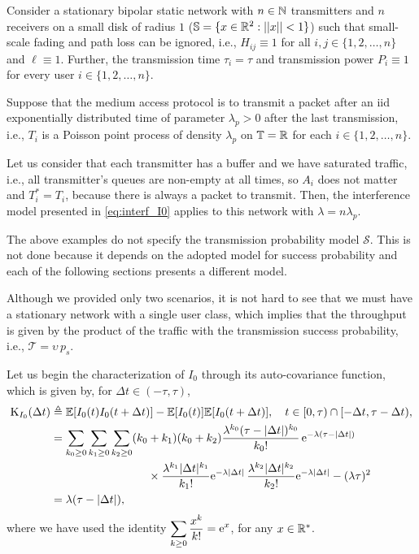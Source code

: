 \begin{example}
    Consider a stationary bipolar static network with $n\in{\mathbb N}$ transmitters and $n$ receivers on a small disk of radius $1$ (${\mathbb S}=\{x\in{\mathbb R}^2: ||x|| < 1\}$) such that small-scale fading and path loss can be ignored, i.e., $H_{ij} \equiv 1$ for all $i,j\in\{1,2,\dots,n\}$ and $\ell \equiv 1$.
    Further, the transmission time $\tau_i = \tau$ and transmission power $P_i \equiv 1$ for every user $i\in\{1,2,\dots,n\}$.
    
    Suppose that the medium access protocol is to transmit a packet after an iid exponentially distributed time of parameter $\lambda_p > 0$ after the last transmission, i.e., $T_i$ is a Poisson point process of density $\lambda_p$ on ${\mathbb T} = {\mathbb R}$ for each $i\in\{1,2,\dots,n\}$.

    Let us consider that each transmitter has a buffer and we have saturated traffic, i.e., all transmitter's queues are non-empty at all times, so $A_i$ does not matter and $T_i^* = T_i$, because there is always a packet to transmit.
    Then, the interference model presented in \eqref{eq:interf_I0} applies to this network with $\lambda = n\lambda_p$.
\end{example}

The above examples do not specify the transmission probability model $\mathscr{S}$. This is not done because it depends on the adopted model for success probability and each of the following sections presents a different model.

Although we provided only two scenarios, it is not hard to see that we must have a stationary network with a single user class, which implies that the throughput is given by the product of the traffic with the transmission success probability, i.e., $\mathscr{T} = \upsilon\,p_s$.

Let us begin the characterization of $I_0$ through its auto-covariance function, which is given by, for $\Delta t\in(-\tau,\tau)$,
\begin{align*}
    \mathrm{K}_{I_0}(\Delta t)
        &\triangleq \E[I_0(t) I_0(t+\Delta t)] - \E[I_0(t)] \E[I_0(t+\Delta t)], \quad t\in[0,\tau)\cap[-\Delta t, \tau-\Delta t),\\
        &= \sum_{k_0\ge 0}\sum_{k_1\ge 0}\sum_{k_2\ge 0} (k_0+k_1)(k_0+k_2) \frac{\lambda^{k_0}(\tau-|\Delta t|)^{k_0}}{k_0!}\,\euler^{-\lambda(\tau-|\Delta t|)}\\
        &\hspace{30mm} \times\frac{\lambda^{k_1}|\Delta t|^{k_1}}{k_1!}\euler^{-\lambda|\Delta t|} \,\frac{\lambda^{k_2}|\Delta t|^{k_2}}{k_2!}\euler^{-\lambda|\Delta t|} - (\lambda\tau)^2\\
        &= \lambda(\tau - |\Delta t|),
\end{align*}
where we have used the identity $\displaystyle\sum_{k\ge0} \frac{x^k}{k!} = \mathrm{e}^x$, for any $x\in{\mathbb R}^*$.

